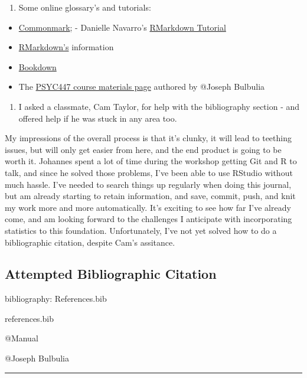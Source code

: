 \documentclass[
]{article}
\providecommand{\tightlist}{%
  \setlength{\itemsep}{0pt}\setlength{\parskip}{0pt}}
\begin{document}
\begin{enumerate}
\def\labelenumi{\arabic{enumi}.}
\setcounter{enumi}{2}
\tightlist
\item
  Some online glossary's and tutorials:
\end{enumerate}

\begin{itemize}
\tightlist
\item
  \href{https://commonmark.org/help/tutorial/index.html}{Commonmark}; -
  Danielle Navarro's
  \href{https://slides.djnavarro.net/starting-rmarkdown/\#1}{RMarkdown
  Tutorial}
\item
  \href{https://rmarkdown.rstudio.com/authoring_pandoc_markdown.html\#Pandoc_Markdown}{RMarkdown's}
  information
\item
  \href{https://bookdown.org/yihui/rmarkdown-cookbook/bibliography.html?fbclid=IwAR2UZgrVmVVolAr08TxKGeAEd-dxcb0gJHBgI477E48ZAuR7ZHpKRr9g-js}{Bookdown}
\item
  The \href{https://go-bayes.github.io/psych-447/about.htm}{PSYC447
  course materials page} authored by @Joseph Bulbulia
\end{itemize}

\begin{enumerate}
\def\labelenumi{\arabic{enumi}.}
\setcounter{enumi}{3}
\tightlist
\item
  I asked a classmate, Cam Taylor, for help with the bibliography
  section - and offered help if he was stuck in any area too.
\end{enumerate}

My impressions of the overall process is that it's clunky, it will lead
to teething issues, but will only get easier from here, and the end
product is going to be worth it. Johannes spent a lot of time during the
workshop getting Git and R to talk, and since he solved those problems,
I've been able to use RStudio without much hassle. I've needed to search
things up regularly when doing this journal, but am already starting to
retain information, and save, commit, push, and knit my work more and
more automatically. It's exciting to see how far I've already come, and
am looking forward to the challenges I anticipate with incorporating
statistics to this foundation. Unfortunately, I've not yet solved how to
do a bibliographic citation, despite Cam's assitance.

\hypertarget{attempted-bibliographic-citation}{%
\subsection{Attempted Bibliographic
Citation}\label{attempted-bibliographic-citation}}

bibliography: References.bib

references.bib

@Manual

@Joseph Bulbulia

\begin{center}\rule{0.5\linewidth}{0.5pt}\end{center}
\end{document}
